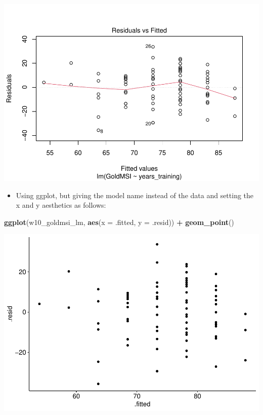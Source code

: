 \documentclass[
]{book}
\newenvironment{Shaded}{\begin{snugshade}}{\end{snugshade}}
\newcommand{\AttributeTok}[1]{\textcolor[rgb]{0.13,0.29,0.53}{#1}}
\newcommand{\FunctionTok}[1]{\textcolor[rgb]{0.13,0.29,0.53}{\textbf{#1}}}
\newcommand{\NormalTok}[1]{#1}
\newcommand{\SpecialCharTok}[1]{\textcolor[rgb]{0.81,0.36,0.00}{\textbf{#1}}}
\providecommand{\tightlist}{%
  \setlength{\itemsep}{0pt}\setlength{\parskip}{0pt}}
\begin{document}
\includegraphics{_main_files/figure-latex/unnamed-chunk-196-1.pdf}

\begin{itemize}
\tightlist
\item
  Using ggplot, but giving the model name instead of the data and setting the x and y aesthetics as follows:
\end{itemize}

\begin{Shaded}
\begin{Highlighting}[]
\FunctionTok{ggplot}\NormalTok{(w10\_goldmsi\_lm, }\FunctionTok{aes}\NormalTok{(}\AttributeTok{x =}\NormalTok{ .fitted, }\AttributeTok{y =}\NormalTok{ .resid)) }\SpecialCharTok{+}
  \FunctionTok{geom\_point}\NormalTok{()}
\end{Highlighting}
\end{Shaded}

\includegraphics{_main_files/figure-latex/unnamed-chunk-197-1.pdf}
\end{document}
